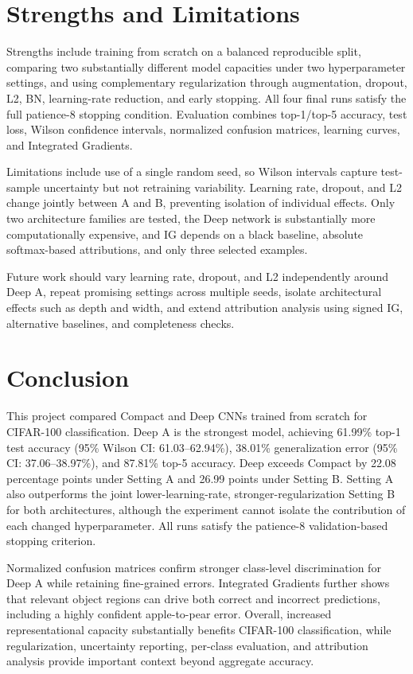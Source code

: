 \documentclass[conference]{IEEEtran}
\begin{document}
\section{Strengths and Limitations}

Strengths include training from scratch on a balanced reproducible split, comparing two substantially different model capacities under two hyperparameter settings, and using complementary regularization through augmentation, dropout, L2, BN, learning-rate reduction, and early stopping. All four final runs satisfy the full patience-8 stopping condition. Evaluation combines top-1/top-5 accuracy, test loss, Wilson confidence intervals, normalized confusion matrices, learning curves, and Integrated Gradients.

Limitations include use of a single random seed, so Wilson intervals capture test-sample uncertainty but not retraining variability. Learning rate, dropout, and L2 change jointly between A and B, preventing isolation of individual effects. Only two architecture families are tested, the Deep network is substantially more computationally expensive, and IG depends on a black baseline, absolute softmax-based attributions, and only three selected examples.

Future work should vary learning rate, dropout, and L2 independently around Deep A, repeat promising settings across multiple seeds, isolate architectural effects such as depth and width, and extend attribution analysis using signed IG, alternative baselines, and completeness checks.


\section{Conclusion}

This project compared Compact and Deep CNNs trained from scratch for CIFAR-100 classification. Deep A is the strongest model, achieving 61.99\% top-1 test accuracy (95\% Wilson CI: 61.03--62.94\%), 38.01\% generalization error (95\% CI: 37.06--38.97\%), and 87.81\% top-5 accuracy. Deep exceeds Compact by 22.08 percentage points under Setting A and 26.99 points under Setting B. Setting A also outperforms the joint lower-learning-rate, stronger-regularization Setting B for both architectures, although the experiment cannot isolate the contribution of each changed hyperparameter. All runs satisfy the patience-8 validation-based stopping criterion.

Normalized confusion matrices confirm stronger class-level discrimination for Deep A while retaining fine-grained errors. Integrated Gradients further shows that relevant object regions can drive both correct and incorrect predictions, including a highly confident apple-to-pear error. Overall, increased representational capacity substantially benefits CIFAR-100 classification, while regularization, uncertainty reporting, per-class evaluation, and attribution analysis provide important context beyond aggregate accuracy.
\end{document}
